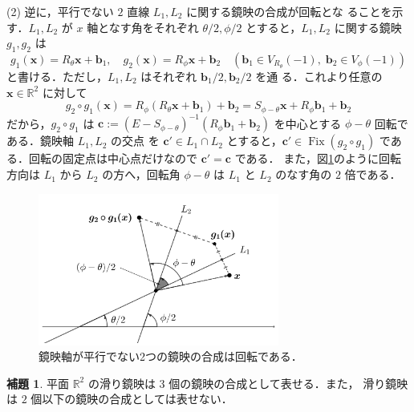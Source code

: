 \documentclass[11pt, uplatex, dvipdfmx, titlepage]{jsarticle}
\makeatletter
\DeclareMathOperator{\Fix}{Fix}
\renewenvironment{proof}[1][\proofname]{\par
  \pushQED{\qed}%
  \normalfont \topsep6\p@\@plus6\p@\relax
  \trivlist
  \item[\hskip\labelsep
         \bfseries
    {#1}]\ignorespaces
}{%
  \popQED\endtrivlist\@endpefalse
}
\theoremstyle{definition}
\newtheorem{lemma}{補題}[section]
\renewcommand{\proofname}{\textbf{証明}}
\makeatother
\begin{document}
\begin{proof}
  \noindent
  (2) 逆に，平行でない $2$ 直線 $L_1, L_2$ に関する鏡映の合成が回転とな
  ることを示す．$L_1, L_2$ が $x$ 軸となす角をそれぞれ $\theta/2,
  \phi/2$ とすると，$L_1, L_2$ に関する鏡映 $g_1, g_2$ は
  \[
    g_1(\bm{x}) = R_{\theta} \bm{x} + \bm{b}_1, \quad g_2(\bm{x}) = R_{\phi}\bm{x} + \bm{b}_2 \quad
    \left(\bm{b}_1 \in V_{R_{\theta}}(-1), \; \bm{b}_2 \in V_{\phi}(-1) \right)
  \]
  と書ける．ただし，$L_1, L_2$ はそれぞれ $\bm{b}_1/2, \bm{b}_2/2$ を通
  る．これより任意の $\bm{x} \in \mathbb{R}^2$ に対して
  \[
    g_2 \circ g_1(\bm{x}) = R_{\phi}( R_{\theta}\bm{x}+\bm{b}_1) + \bm{b}_2
    = S_{\phi-\theta} \bm{x} + R_{\phi}\bm{b}_1 +\bm{b}_2
  \]
  だから，$g_2 \circ
  g_1$ は
  $\bm{c}:=(E-S_{\phi-\theta})^{-1}\left(R_{\phi}\bm{b}_1+\bm{b}_2\right)$
  を中心とする $\phi-\theta$ 回転である．鏡映軸 $L_1, L_2$ の交点
  を $\bm{c}' \in L_1 \cap L_2$ とすると，$\bm{c}' \in \Fix(g_2 \circ
  g_1)$ である．回転の固定点は中心点だけなので $\bm{c}'=\bm{c}$ である．
  また，図\ref{fig:rotation2refgen}のように回転方向は $L_1$ から $L_2$
  の方へ，回転角 $\phi-\theta$ は $L_1$ と $L_2$ のなす角の $2$ 倍である．
  \begin{figure}[h]
    \centering
    \includegraphics[height=5cm]{pictures/rotation2refgen.pdf}   
    \caption{鏡映軸が平行でない2つの鏡映の合成は回転である．}
    \label{fig:rotation2refgen}
  \end{figure}
\end{proof}


\begin{lemma}\label{lem:glide2ref}
  平面 $\mathbb{R}^2$ の滑り鏡映は $3$ 個の鏡映の合成として表せる．また，
  滑り鏡映は $2$ 個以下の鏡映の合成としては表せない．
\end{lemma}
  
\end{document}
